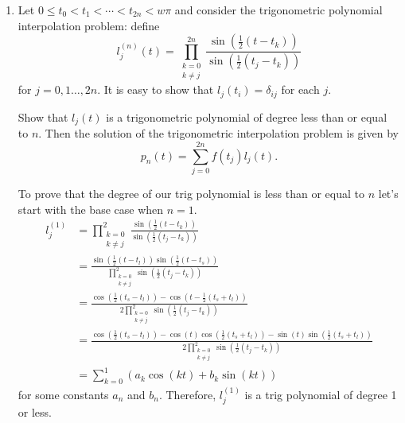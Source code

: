 \documentclass[a4paper,12pt]{article}
\begin{document}
\begin{enumerate}[label = (\arabic*)]
	\newpage
	\item Let $ 0 \leq t_0 < t_1 < \cdots < t_{2n} < w\pi $ and consider the trigonometric polynomial interpolation problem: define
	\[
		l_j^{(n)}(t) = \prod_{\substack{k = 0 \\ k \neq j}}^{2n} \frac{\sin\left(\frac{1}{2} (t - t_k)\right)}{\sin\left(\frac{1}{2} (t_j - t_k)\right)}
	\]
	for $ j = 0, 1 \ldots, 2n $. It is easy to show that $ l_j(t_i) = \delta_{ij} $ for each $ j $.
	
	Show that $ l_j(t) $ is a trigonometric polynomial of degree less than or equal to $ n $. Then the solution of the trigonometric interpolation problem is given by
	\[
		p_n(t) = \sum_{j = 0}^{2n} f(t_j) l_j(t).
	\]
	
	To prove that the degree of our trig polynomial is less than or equal to $ n $ let's start with the base case when $ n = 1 $.
	\begin{align*}
		l_j^{(1)} &=  \prod_{\substack{k = 0 \\ k \neq j}}^{2} \frac{\sin\left(\frac{1}{2} (t - t_k)\right)}{\sin\left(\frac{1}{2} (t_j - t_k)\right)} \\ 
		&= \frac{\sin\left(\frac{1}{2} (t - t_l)\right)\sin\left(\frac{1}{2} (t - t_s)\right)}{\prod\limits_{\substack{k = 0 \\ k \neq j}}^{2} \sin\left(\frac{1}{2} (t_j - t_k)\right)} \\
		&= \frac{\cos\left(\frac{1}{2}(t_s - t_l)\right) - \cos\left(t - \frac{1}{2}(t_s + t_l)\right)}{2\prod\limits_{\substack{k = 0 \\ k \neq j}}^{2} \sin\left(\frac{1}{2} (t_j - t_k)\right)} \\
		&= \frac{\cos\left(\frac{1}{2}(t_s - t_l)\right) - \cos(t)\cos\left(\frac{1}{2}(t_s + t_l)\right) - \sin(t)\sin\left(\frac{1}{2}(t_s + t_l)\right)}{2\prod\limits_{\substack{k = 0 \\ k \neq j}}^{2} \sin\left(\frac{1}{2} (t_j - t_k)\right)} \\
		&= \sum_{k = 0}^{1} \left(a_k \cos(kt) + b_k \sin(kt)\right)
	\end{align*}
	for some constants $ a_n $ and $ b_n $. Therefore, $ l_j^{(1)} $ is a trig polynomial of degree 1 or less.
	

\end{enumerate}
\end{document}
